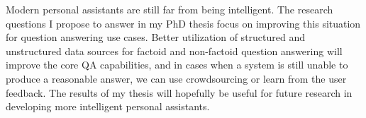 Modern personal assistants are still far from being intelligent.
The research questions I propose to answer in my PhD thesis focus on improving this situation for question answering use cases.
Better utilization of structured and unstructured data sources for factoid and non-factoid question answering will improve the core QA capabilities, and in cases when a system is still unable to produce a reasonable answer, we can use crowdsourcing or learn from the user feedback.
The results of my thesis will hopefully be useful for future research in developing more intelligent personal assistants.